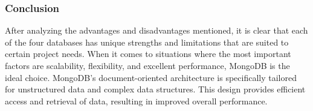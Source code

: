 \subsubsection{Conclusion}

After analyzing the advantages and disadvantages mentioned, it is clear that each of the four databases has unique strengths and limitations that are suited to certain project needs. When it comes to situations where the most important factors are scalability, flexibility, and excellent performance, MongoDB is the ideal choice. MongoDB's document-oriented architecture is specifically tailored for unstructured data and complex data structures. This design provides efficient access and retrieval of data, resulting in improved overall performance.
